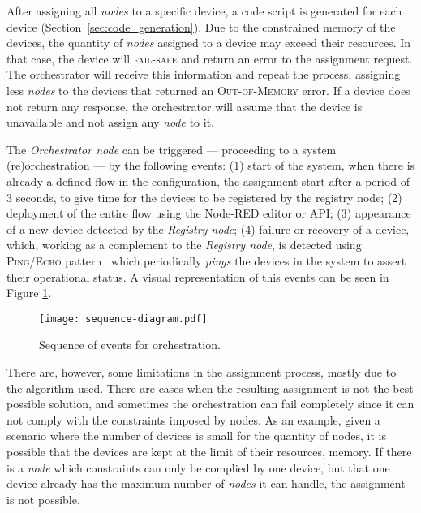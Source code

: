 After assigning all \textit{nodes} to a specific device, a code script is generated for each device (\cf Section~\ref{sec:code_generation}). Due to the constrained memory of the devices, the quantity of \textit{nodes} assigned to a device may exceed their resources. In that case, the device will \textsc{fail-safe} and return an error to the assignment request. The orchestrator will receive this information and repeat the process, assigning less \textit{nodes} to the devices that returned an \textsc{Out-of-Memory} error. If a device does not return any response, the orchestrator will assume that the device is unavailable and not assign any \textit{node} to it.

The \textit{Orchestrator node} can be triggered --- proceeding to a system (re)orchestration --- by the following events: (1) start of the system, when there is already a defined flow in the configuration, the assignment start after a period of 3 seconds, to give time for the devices to be registered by the registry node; (2) deployment of the entire flow using the Node-RED editor or API; (3) appearance of a new device detected by the \textit{Registry node}; (4) failure or recovery of a device, which, working as a complement to the \textit{Registry node}, is detected using \textsc{Ping/Echo} pattern~\cite{Scott2009} which periodically \textit{pings} the devices in the system to assert their operational status. A visual representation of this events can be seen in Figure \ref{fig:sequence_diagram}. 

\begin{figure}[h]
\centering
\texttt{[image: sequence-diagram.pdf]}
\caption[Sequence of events for orchestration.]{Sequence of events for orchestration.}\label{fig:sequence_diagram}
\end{figure}

There are, however, some limitations in the assignment process, mostly due to the algorithm used. There are cases when the resulting assignment is not the best possible solution, and sometimes the orchestration can fail completely since it can not comply with the constraints imposed by nodes. As an example, given a scenario where the number of devices is small for the quantity of nodes, it is possible that the devices are kept at the limit of their resources, \ie memory. If there is a \textit{node} which constraints can only be complied by one device, but that one device already has the maximum number of \textit{nodes} it can handle, the assignment is not possible.

